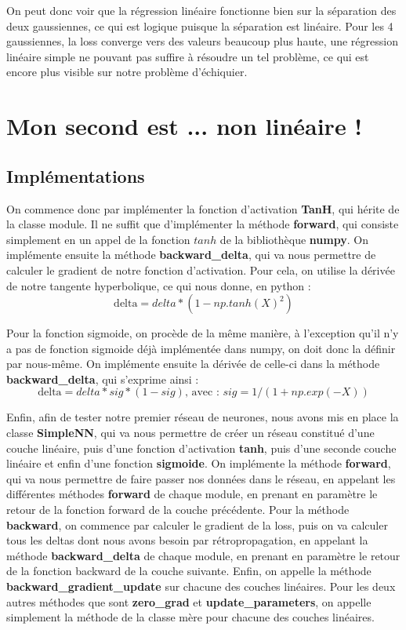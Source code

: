 \documentclass{article}
\begin{document}
On peut donc voir que la régression linéaire fonctionne bien sur la séparation des deux gaussiennes, ce qui est logique puisque la séparation est linéaire. Pour les 4 gaussiennes, la loss converge vers des valeurs beaucoup plus haute, une régression linéaire simple ne pouvant pas suffire à résoudre un tel problème, ce qui est encore plus visible sur notre problème d'échiquier.

\section{Mon second est ... non linéaire !}
\subsection{Implémentations}
On commence donc par implémenter la fonction d'activation \textbf{TanH}, qui hérite de la classe module. Il ne suffit que d'implémenter la méthode \textbf{forward}, qui consiste simplement en un appel de la fonction $tanh$ de la bibliothèque \textbf{numpy}. On implémente ensuite la méthode \textbf{backward\_delta}, qui va nous permettre de calculer le gradient de notre fonction d'activation. Pour cela, on utilise la dérivée de notre tangente hyperbolique, ce qui nous donne, en python : 
\[
\text{delta} = delta * (1 - np.tanh(X) ^ 2)
\]

Pour la fonction sigmoide, on procède de la même manière, à l'exception qu'il n'y a pas de fonction sigmoide déjà implémentée dans numpy, on doit donc la définir par nous-même. On implémente ensuite la dérivée de celle-ci dans la méthode \textbf{backward\_delta}, qui s'exprime ainsi :
\[
\text{delta} = delta * sig * (1 - sig) \text{, avec : } sig = 1 / (1 + np.exp(-X))
\]

Enfin, afin de tester notre premier réseau de neurones, nous avons mis en place la classe \textbf{SimpleNN}, qui va nous permettre de créer un réseau constitué d'une couche linéaire, puis d'une fonction d'activation \textbf{tanh}, puis d'une seconde couche linéaire et enfin d'une fonction \textbf{sigmoide}. On implémente la méthode \textbf{forward}, qui va nous permettre de faire passer nos données dans le réseau, en appelant les différentes méthodes \textbf{forward} de chaque module, en prenant en paramètre le retour de la fonction forward de la couche précédente. Pour la méthode \textbf{backward}, on commence par calculer le gradient de la loss, puis on va calculer tous les deltas dont nous avons besoin par rétropropagation, en appelant la méthode \textbf{backward\_delta} de chaque module, en prenant en paramètre le retour de la fonction backward de la couche suivante. Enfin, on appelle la méthode \textbf{backward\_gradient\_update} sur chacune des couches linéaires. Pour les deux autres méthodes que sont \textbf{zero\_grad} et \textbf{update\_parameters}, on appelle simplement la méthode de la classe mère pour chacune des couches linéaires.
\end{document}
